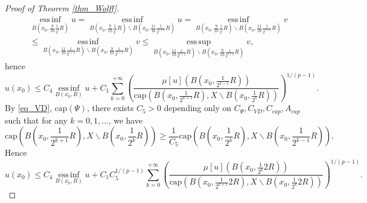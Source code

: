 \documentclass[10pt,a4paper]{amsart}
\newcommand{\einf}{\operatorname*{ess\,inf}}
\newcommand{\esup}{\operatorname*{ess\,sup}}
\begin{document}
\begin{proof}[Proof of Theorem \ref{thm_Wolff}]
\begin{align*}
&\einf_{B(x_0,\frac{9}{10}\frac{1}{2^{l}}R)}u= \einf_{B(x_0,\frac{9}{10}\frac{1}{2^{l}}R)\backslash B(x_0,\frac{11}{10}\frac{1}{2^{l+1}}R)}u=\einf_{B(x_0,\frac{9}{10}\frac{1}{2^{l}}R)\backslash B(x_0,\frac{11}{10}\frac{1}{2^{l+1}}R)}v\\
&\le \einf_{B(x_0,\frac{11}{10}\frac{1}{2^{l+1}}R)\backslash B(x_0,\frac{9}{10}\frac{1}{2^{l+1}}R)}v\le \esup_{B(x_0,\frac{11}{10}\frac{1}{2^{l+1}}R)\backslash B(x_0,\frac{9}{10}\frac{1}{2^{l+1}}R)}v,
\end{align*}
hence
$$u(x_0)\le C_4\einf_{B(x_0,R)}u+C_1\sum_{k=0}^{+\infty}\left(\frac{\mu[u](B(x_0,\frac{1}{2^{k-1}}R))}{\mathrm{cap}\left(B(x_0,\frac{1}{2^{k+1}}R),X\backslash B(x_0,\frac{1}{2^k}R)\right)}\right)^{1/(p-1)}.$$
By \ref{eq_VD}, \hyperlink{eq_cap}{$\text{cap}(\Psi)$}, there exists $C_5>0$ depending only on $C_\Psi,C_{VD},C_{cap},A_{cap}$ such that for any $k=0,1,\ldots$, we have
$$\mathrm{cap}\left(B(x_0,\frac{1}{2^{k+1}}R),X\backslash B(x_0,\frac{1}{2^k}R)\right)\ge \frac{1}{C_5}\mathrm{cap}\left(B(x_0,\frac{1}{2^{k}}R),X\backslash B(x_0,\frac{1}{2^{k-1}}R)\right).$$
Hence
$$u(x_0)\le C_4\einf_{B(x_0,R)}u+C_1C_5^{1/(p-1)}\sum_{k=0}^{+\infty}\left(\frac{\mu[u](B(x_0,\frac{1}{2^{k}}2R))}{\mathrm{cap}\left(B(x_0,\frac{1}{2^{k+1}}2R),X\backslash B(x_0,\frac{1}{2^k}2R)\right)}\right)^{1/(p-1)}.$$
\end{proof}
\end{document}
